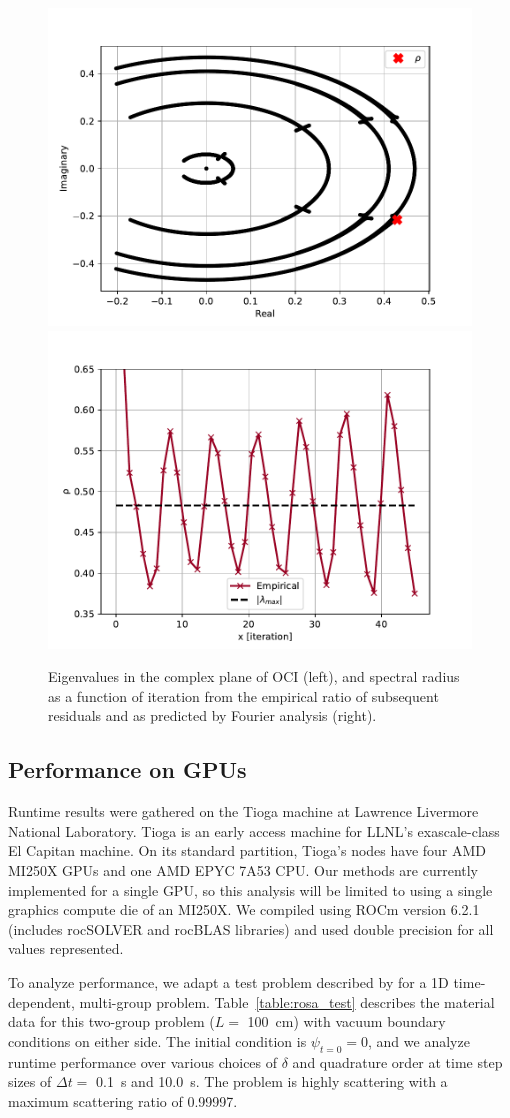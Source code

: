 \begin{figure}
    \centering
    \includegraphics[width=.49\textwidth]{deterministic/therefore_paper/therefore_figs/eig_plot.pdf}
    \includegraphics[width=.49\textwidth]{deterministic/therefore_paper/therefore_figs/eig_spec_rad.pdf}
    \caption{Eigenvalues in the complex plane of OCI (left), and spectral radius as a function of iteration from the empirical ratio of subsequent residuals and as predicted by Fourier analysis (right).}
    \label{fig:eigplot}
\end{figure}

\subsection{Performance on GPUs}

Runtime results were gathered on the Tioga machine at Lawrence Livermore National Laboratory.
Tioga is an early access machine for LLNL's exascale-class El Capitan machine.
On its standard partition, Tioga's nodes have four AMD MI250X GPUs and one AMD EPYC 7A53 CPU.
Our methods are currently implemented for a single GPU, so this analysis will be limited to using a single graphics compute die of an MI250X.
We compiled using ROCm version 6.2.1 (includes rocSOLVER and rocBLAS libraries) and used double precision for all values represented.

To analyze performance, we adapt a test problem described by \cite{rosa_cellwise_2013} for a 1D time-dependent, multi-group problem.
Table~\ref{table:rosa_test} describes the material data for this 
two-group problem ($L=$ \SI{100}{\centi\meter}) with vacuum boundary conditions on either side. 
The initial condition is $\psi_{t=0} = 0$, and we analyze runtime performance over various choices of $\delta$ and quadrature order at time step sizes of $\Delta t=$ \SI{0.1}{\s} and \SI{10.0}{\s}.
The problem is highly scattering with a maximum scattering ratio of \num{0.99997}.


